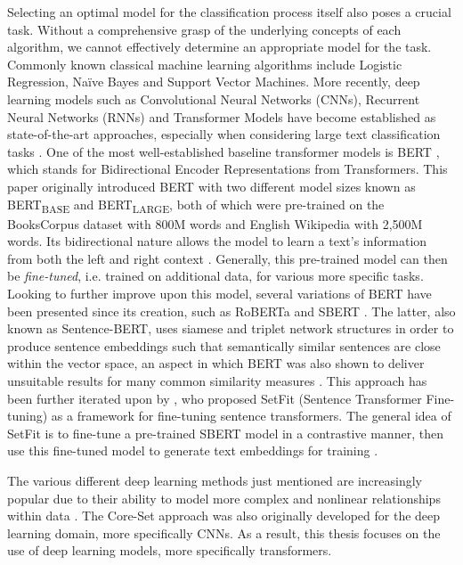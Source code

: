 \documentclass[english,bachelor,ul]{webisthesis} %
\begin{document}
Selecting an optimal model for the classification process itself also poses a crucial task. Without a comprehensive grasp of the underlying concepts of each algorithm, we cannot effectively determine an appropriate model for the task. Commonly known classical machine learning algorithms include Logistic Regression, Na\"ive Bayes and Support Vector Machines. More recently, deep learning models such as Convolutional Neural Networks (CNNs), Recurrent Neural Networks (RNNs) and Transformer Models have become established as state-of-the-art approaches, especially when considering large text classification tasks \citep{chen2015convolutional, DBLP:conf/ijcai/LiuQH16, DBLP:conf/aaai/LaiXLZ15, DBLP:conf/naacl/DevlinCLT19, DBLP:conf/cncl/SunQXH19}. One of the most well-established baseline transformer models is BERT \citep{DBLP:conf/naacl/DevlinCLT19}, which stands for Bidirectional Encoder Representations from Transformers. This paper originally introduced BERT with two different model sizes known as BERT\textsubscript{BASE} and BERT\textsubscript{LARGE}, both of which were pre-trained on the BooksCorpus dataset \citep{DBLP:conf/iccv/ZhuKZSUTF15} with 800M words and English Wikipedia with 2,500M words. 
Its bidirectional nature allows the model to learn a text's information from both the left and right context \citep{DBLP:conf/naacl/DevlinCLT19}. Generally, this pre-trained model can then be \textit{fine-tuned}, i.e. trained on additional data, for various more specific tasks. Looking to further improve upon this model, several variations of BERT have been presented since its creation, such as RoBERTa \citep{DBLP:journals/corr/abs-1907-11692} and SBERT \citep{DBLP:conf/emnlp/ReimersG19}. The latter, also known as Sentence-BERT, uses siamese and triplet network structures in order to produce sentence embeddings such that semantically similar sentences are close within the vector space, an aspect in which BERT was also shown to deliver unsuitable results for many common similarity measures \citep{DBLP:conf/emnlp/ReimersG19}. This approach has been further iterated upon by \cite{DBLP:setfit}, who proposed SetFit (Sentence Transformer Fine-tuning) as a framework for fine-tuning sentence transformers. The general idea of SetFit is to fine-tune a pre-trained SBERT model in a contrastive manner, then use this fine-tuned model to generate text embeddings for training \citep{DBLP:setfit}. 

The various different deep learning methods just mentioned are increasingly popular due to their ability to model more complex and nonlinear relationships within data \citep{DBLP:journals/nature/LeCunBH15}.
The Core-Set approach was also originally developed for the deep learning domain, more specifically CNNs. As a result, this thesis focuses on the use of deep learning models, more specifically transformers.
\end{document}
